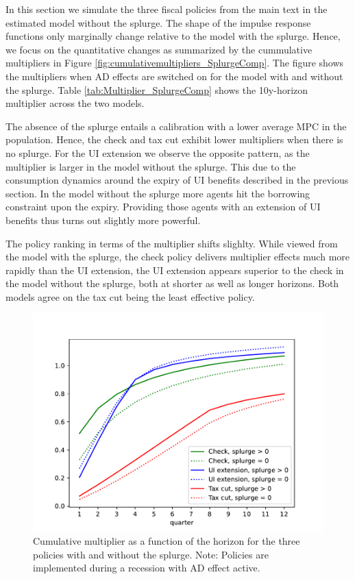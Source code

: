 \documentclass[\econtexRoot/HAFiscal]{subfiles}
\begin{document}
In this section we simulate the three fiscal policies from the main text in the estimated model without the splurge. The shape of the impulse response functions only marginally change relative to the model with the splurge. Hence, we focus on the quantitative changes as summarized by the cummulative multipliers in Figure \ref{fig:cumulativemultipliers_SplurgeComp}. The figure shows the multipliers when AD effects are switched on for the model with and without the splurge. Table \ref{tab:Multiplier_SplurgeComp} shows the 10y-horizon multiplier across the two models.

The absence of the splurge entails a calibration with a lower average MPC in the population. Hence, the check and tax cut exhibit lower multipliers when there is no splurge. For the UI extension we observe the opposite pattern, as the multiplier is larger in the model without the splurge. This due to the consumption dynamics around the expiry of UI benefits described in the previous section. In the model without the splurge more agents hit the borrowing constraint upon the expiry. Providing those agents with an extension of UI benefits thus turns out slightly more powerful. 

The policy ranking in terms of the multiplier shifts slighlty. While viewed from the model with the splurge, the check policy delivers multiplier effects much more rapidly than the UI extension, the UI extension appears superior to the check in the model without the splurge, both at shorter as well as longer horizons. Both models agree on the tax cut being the least effective policy. 

\begin{figure}[t]
	\centering
	\includegraphics[width=0.8\linewidth]{Code/HA-Models/FromPandemicCode/Figures/Splurge0/Cummulative_multipliers_SplurgeComp}
	\caption{Cumulative multiplier as a function of the horizon for the three policies with and without the splurge. Note: Policies are implemented during a recession with AD effect active.}
	\notinsubfile{\label{fig:cumulativemultipliers_SplurgeComp}}
\end{figure}
\end{document}
